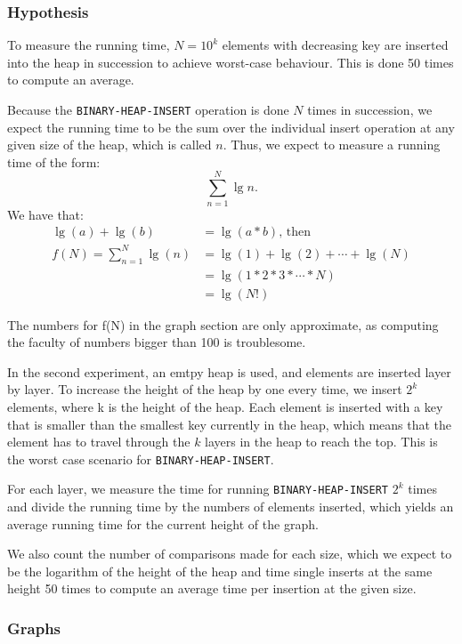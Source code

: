 \documentclass[a4paper,oneside,11pt]{article}
\begin{document}
\begin{itemize}
\subsubsection*{Hypothesis}
To measure the running time, $N=10^k$ elements with decreasing key are inserted into the heap in succession to achieve worst-case behaviour. This is done 50 times to compute an average.

Because the \texttt{BINARY-HEAP-INSERT} operation is done $N$ times in succession, we expect the running time to be the sum over the individual insert operation at any given size of the heap, which is called $n$.
Thus, we expect to measure a running time of the form: \[\sum^N_{n=1}\lg n.\]
We have that:
\begin{align*}
  \lg(a)+\lg(b)&=\lg(a*b)\text{, then}\\
  f(N)=\sum^N_{n=1}\lg(n)&=\lg(1)+\lg(2)+\cdots+\lg(N)\\
  &=\lg(1*2*3*\cdots *N)\\
  &=\lg(N!)
\end{align*}

The numbers for f(N) in the graph section are only approximate, as computing the faculty of numbers bigger than 100 is troublesome.

In the second experiment, an emtpy heap is used, and elements are inserted layer by layer. To increase the height of the heap by one every time, we insert $2^k$ elements, where k is the height of the heap. Each element is inserted with a key that is smaller than the smallest key currently in the heap, which means that the element has to travel through the $k$ layers in the heap to reach the top. This is the worst case scenario for \texttt{BINARY-HEAP-INSERT}.

For each layer, we measure the time for running \texttt{BINARY-HEAP-INSERT} $2^k$ times and divide the running time by the numbers of elements inserted, which yields an average running time for the current height of the graph.

We also count the number of comparisons made for each size, which we expect to be the logarithm of the height of the heap and time single inserts at the same height 50 times to compute an average time per insertion at the given size.
\subsubsection*{Graphs}


\end{itemize}
\end{document}
